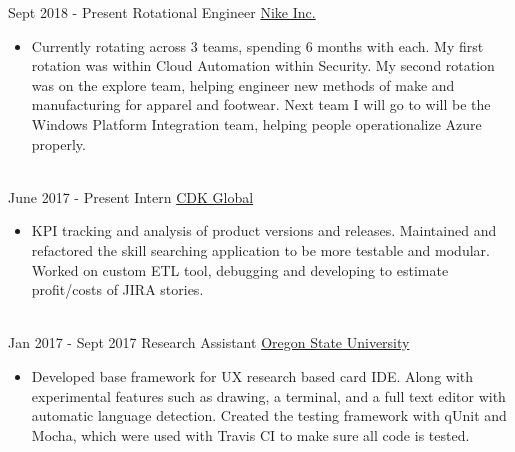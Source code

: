 \documentclass[letterpaper]{twentysecondcv} %
\begin{document}
\begin{twenty} %
\twentyitem
    	{Sept 2018 -}
		{Present}
        {Rotational Engineer}
        {\href{https://www.nike.com/}{Nike Inc.}}
        {}
        {\begin{itemize}
        \item Currently rotating across 3 teams, spending 6 months with each. My first rotation was within Cloud Automation within Security. My second rotation was on the explore team, helping engineer new methods of make and manufacturing for apparel and footwear. Next team I will go to will be the Windows Platform Integration team, helping people operationalize Azure properly.
        \end{itemize}}
        \\

\twentyitem
    	{June 2017 -}
		{Present}
        {Intern}
        {\href{https://www.cdkglobal.com/}{CDK Global}}
        {}
        {\begin{itemize}
        \item KPI tracking and analysis of product versions and releases. Maintained and refactored the skill searching application to be more testable and modular. Worked on custom ETL tool, debugging and developing to estimate profit/costs of JIRA stories. 
        \end{itemize}}
        \\
	\twentyitem
    	{Jan 2017 -}
		{Sept 2017}
        {Research Assistant}
        {\href{http://www.oregonstate.edu}{Oregon State University}}
        {}
        {
        {\begin{itemize}
        \item Developed base framework for UX research based card IDE. Along with experimental features such as drawing, a terminal, and a full text editor with automatic language detection. Created the testing framework with qUnit and Mocha, which were used with Travis CI to make sure all code is tested. 
    \end{itemize}}
    	}
        
\end{twenty}
\end{document}
